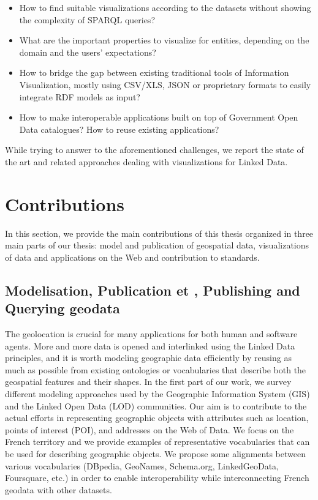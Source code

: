 \documentclass[a4paper,11pt,twoside]{report}
\begin{document}
\begin{itemize}
\item  How to find suitable visualizations according to the datasets without showing the complexity of SPARQL queries?
 \item  What are the important properties to visualize for entities, depending on the domain and the users' expectations?
 \item  How to bridge the gap between existing traditional tools of Information Visualization, mostly using CSV/XLS, JSON or proprietary formats to easily integrate RDF models as input?
 \item How to make interoperable applications built on top of Government Open Data catalogues? How to reuse existing applications?
\end{itemize}
 
 While trying to answer to the aforementioned challenges, we report the state of the art and related approaches dealing with visualizations for Linked Data. 


\section{Contributions}
\label{sec:contributions}
In this section, we provide the main contributions of this thesis organized in three main parts of our thesis: model and publication of geospatial data, visualizations of data and applications on the Web and contribution to standards. 

\subsection{Modelisation, Publication et , Publishing and Querying geodata}
The geolocation is crucial for many applications for both human and software agents. More and more data is opened and interlinked using the Linked Data principles, and it is worth modeling geographic data efficiently by reusing as much as possible from existing ontologies or vocabularies that describe both the geospatial features and their shapes. In the first part of our work, we survey different modeling approaches used by the Geographic Information System (GIS) and the Linked Open Data (LOD) communities. Our aim is to contribute to the actual efforts in representing geographic objects with attributes such as location, points of interest (POI), and addresses on the Web of Data. We focus on the French territory and we provide examples of representative vocabularies that can be used for describing geographic objects. We propose some alignments between various vocabularies (DBpedia, GeoNames, Schema.org, LinkedGeoData, Foursquare, etc.) in order to enable interoperability while interconnecting French geodata with other datasets. 
\end{document}
